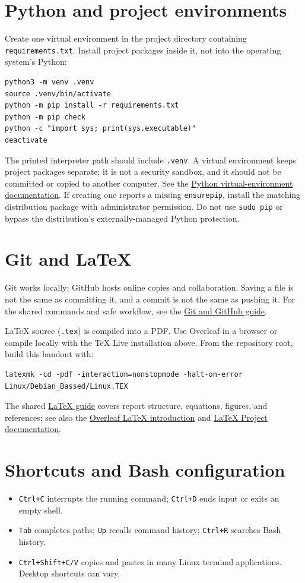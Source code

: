 \documentclass[11pt]{article}
\begin{document}
\section{Python and project environments}
Create one virtual environment in the project directory containing
\texttt{requirements.txt}. Install project packages inside it, not into the
operating system's Python:
\begin{lstlisting}
python3 -m venv .venv
source .venv/bin/activate
python -m pip install -r requirements.txt
python -m pip check
python -c "import sys; print(sys.executable)"
deactivate
\end{lstlisting}
The printed interpreter path should include \texttt{.venv}. A virtual
environment keeps project packages separate; it is not a security sandbox,
and it should not be committed or copied to another computer. See the
\href{https://docs.python.org/3/library/venv.html}{Python virtual-environment
documentation}. If creating one reports a missing \texttt{ensurepip}, install
the matching distribution package with administrator permission. Do not use
\texttt{sudo pip} or bypass the distribution's externally-managed Python
protection.

\section{Git and LaTeX}
Git works locally; GitHub hosts online copies and collaboration. Saving a file
is not the same as committing it, and a commit is not the same as pushing it.
For the shared commands and safe workflow, see the
\href{../../Git/Git.pdf}{Git and GitHub guide}.

LaTeX source (\texttt{.tex}) is compiled into a PDF. Use Overleaf in a browser
or compile locally with the TeX Live installation above. From the repository
root, build this handout with:
\begin{lstlisting}
latexmk -cd -pdf -interaction=nonstopmode -halt-on-error Linux/Debian_Bassed/Linux.TEX
\end{lstlisting}
The shared
\href{../../LaTeX/LaTeX.pdf}{LaTeX guide} covers report structure, equations,
figures, and references; see also the
\href{https://www.overleaf.com/learn/latex/Learn_LaTeX_in_30_minutes}{Overleaf
LaTeX introduction} and
\href{https://www.latex-project.org/help/documentation/}{LaTeX Project
documentation}.

\section{Shortcuts and Bash configuration}
\begin{itemize}
\item \texttt{Ctrl+C} interrupts the running command; \texttt{Ctrl+D} ends
input or exits an empty shell.
\item \texttt{Tab} completes paths; \texttt{Up} recalls command history;
\texttt{Ctrl+R} searches Bash history.
\item \texttt{Ctrl+Shift+C/V} copies and pastes in many Linux terminal
applications. Desktop shortcuts can vary.
\end{itemize}
\end{document}
